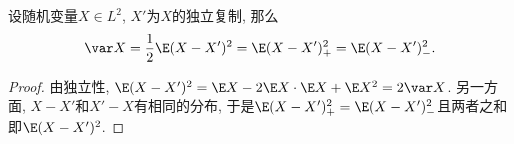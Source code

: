\begin{lemma}[独立复制]
	设随机变量$X \in L^2$, $X'$为$X$的独立复制, 那么
	\begin{equation*}
		\var X = \frac12 \E (X - X')^2
		= \E (X - X')_+^2 = \E (X - X')_-^2. 
	\end{equation*}
\end{lemma}
\begin{proof}
	由独立性, $\E (X - X')^2 = \E X - 2 \E X \cdot \E X + \E X^2 = 2 \var X$. 
	另一方面, $X - X'$和$X' - X$有相同的分布, 于是$\E(X - X')_+^2 = \E(X - X')_-^2$且两者之和即$\E (X - X')^2$. 
\end{proof}

%
%
%
%
%
%

